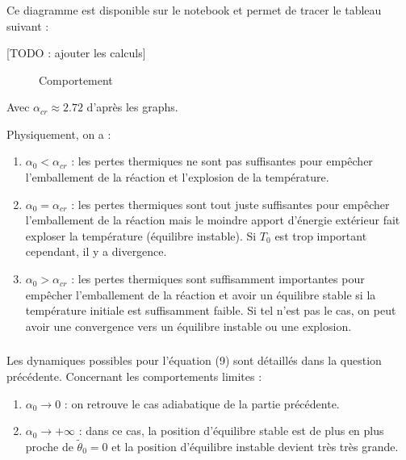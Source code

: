 \documentclass[10pt,a4paper,twocolumn]{report}
\begin{document}
	\subsubsection{} %

	Ce diagramme est disponible sur le notebook et permet de tracer le tableau suivant :

	[TODO : ajouter les calculs]
	
	\begin{figure*}
	\centering
	\caption{Comportement }
	\label{fig:tableau de signe}
	\end{figure*}
	
	Avec $\alpha_{cr} \approx 2.72$ d'après les graphs.
	
	Physiquement, on a :
	\begin{enumerate}
		\item $\alpha_0 < \alpha_{cr}$ : les pertes thermiques ne sont pas suffisantes pour empêcher l'emballement de la réaction et l'explosion de la température.
		\item $\alpha_0 = \alpha_{cr}$ : les pertes thermiques sont tout juste suffisantes pour empêcher l'emballement de la réaction mais le moindre apport d'énergie extérieur fait exploser la température (équilibre instable). Si $T_0$ est trop important cependant, il y a divergence.
		\item $\alpha_0 > \alpha_{cr}$ : les pertes thermiques sont suffisamment importantes pour empêcher l'emballement de la réaction et avoir un équilibre stable si la température initiale est suffisamment faible. Si tel n'est pas le cas, on peut avoir une convergence vers un équilibre instable ou une explosion.
	\end{enumerate}
	
	\subsubsection{} %
	Les dynamiques possibles pour l'équation (9) sont détaillés dans la question précédente. Concernant les comportements limites : 
	\begin{enumerate}
		\item $\alpha_0 \rightarrow 0$ : on retrouve le cas adiabatique de la partie précédente.
		\item $\alpha_0 \rightarrow + \infty$ : dans ce cas, la position d'équilibre stable est de plus en plus proche de $\tilde{\theta}_0 = 0$ et la position d'équilibre instable devient très très grande.
	\end{enumerate}	
	
\end{document}
